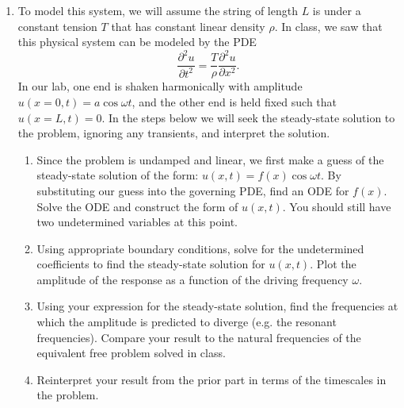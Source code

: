 \documentclass[12pt,letterpaper,english]{article}
\begin{document}
\begin{enumerate}
\item To model this system, we will assume the string of length $L$ is under a constant tension $T$ that has constant linear density $\rho$.  In class, we saw that this physical system can be modeled by the PDE
\begin{equation}
\frac{\partial^2 u}{\partial t^2} = \frac{T}{\rho}\frac{\partial^2 u}{\partial x^2}. \nonumber
\end{equation}
In our lab, one end is shaken harmonically with amplitude $u(x=0,t)=a \cos{\omega t}$, and the other end is held fixed such that $u(x=L,t)=0$.  In the steps below we will seek the steady-state solution to the problem, ignoring any transients, and interpret the solution.

\begin{enumerate}
\item Since the problem is undamped and linear, we first make a guess of the steady-state solution of the form: $u(x,t)=f(x)\cos{\omega t}$.  By substituting our guess into the governing PDE, find an ODE for $f(x)$.  Solve the ODE and construct the form of $u(x,t)$.  You should still have two undetermined variables at this point.
\item Using appropriate boundary conditions, solve for the undetermined coefficients to find the steady-state solution for $u(x,t)$.  Plot the amplitude of the response as a function of the driving frequency $\omega$.
\item Using your expression for the steady-state solution, find the frequencies at which the amplitude is predicted to diverge (e.g. the resonant frequencies).  Compare your result to the natural frequencies of the equivalent free problem solved in class.
\item Reinterpret your result from the prior part in terms of the timescales in the problem. 


\end{enumerate}
\end{enumerate}
\end{document}
